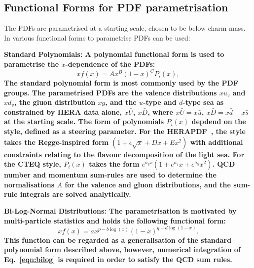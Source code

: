 \subsection{Functional Forms for PDF parametrisation}
The PDFs are parametrised at a starting scale, chosen to be below charm mass.
In \fitter various functional forms to parametrise PDFs can be used:
\begin{description}
\item \bf {Standard Polynomials:} \rm
A polynomial functional form is used to parametrise the $x$-dependence of the PDFs:
\begin{equation}
 xf(x) = A x^{B} (1-x)^{C} P_i(x),
\label{eqn:pdf_std}
\end{equation}
The standard polynomial form is most commonly used by the PDF groups.
The parametrised PDFs are the valence distributions
$xu_v$ and $xd_v$, the gluon distribution $xg$, and the $u$-type and $d$-type sea as constrained by HERA data alone,
$x\bar{U}$, $x\bar{D}$, where $x\bar{U} = x\bar{u}$, 
$x\bar{D} = x\bar{d} +x\bar{s}$ at the starting scale. 
The form of polynomials $P_i(x)$ depdend on the style, defined as a steering parameter. 
For the HERAPDF~\cite{h1zeus:2009wt}, the style takes the Regge-inspired form  
$(1 + \epsilon \sqrt{x} + D x + E x^2)$
with additional constraints relating to the flavour decomposition of the 
light sea. 
For the CTEQ style, $P_i(x)$ takes the form $e^{a_3x} (1 + e^{a_4} x + e^{a_5} x^2)$.
QCD number and momentum sum-rules are used to determine the normalisations $A$ for the valence and gluon
distributions, and the sum-rule integrals are solved analytically.

\item \bf {Bi-Log-Normal Distributions:} \rm
The parametrisation is motivated by multi-particle statistics
and holds the following functional form:
\begin{equation}
 xf(x)=a x^{p-b\log(x)}(1-x)^{q-d \log(1-x)}.
\label{eqn:bilog}
\end{equation}
This function can be regarded as a generalisation of the standard polynomial form described above,
however, numerical integration of Eq.~\ref{eqn:bilog} is required in order to satisfy the QCD sum rules.


\end{description}
